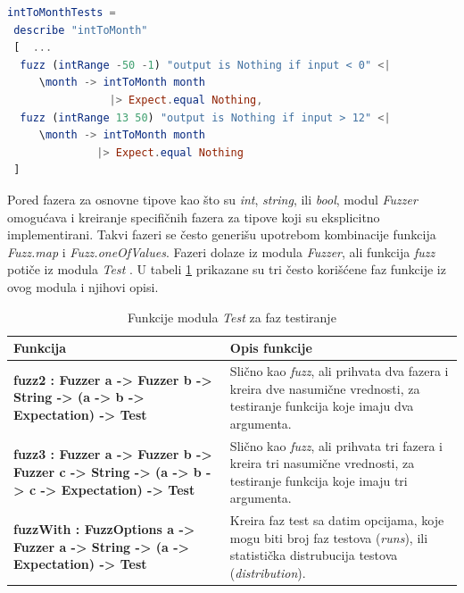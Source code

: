 \documentclass[12pt,oneside]{memoir}
\begin{document}
\begin{minipage}{\linewidth}
\begin{lstlisting}[language=elm, basicstyle=\small, caption={Implementacija faz testova za funkciju \emph{intToMonth}},captionpos=b, label={lst:faztest}]
intToMonthTests =
 describe "intToMonth" 
 [  ...
  fuzz (intRange -50 -1) "output is Nothing if input < 0" <|
     \month -> intToMonth month
     	        |> Expect.equal Nothing, 
  fuzz (intRange 13 50) "output is Nothing if input > 12" <|
     \month -> intToMonth month
              |> Expect.equal Nothing 
 ]
\end{lstlisting}
\end{minipage}

\vspace*{1\baselineskip}
\par Pored fazera za osnovne tipove kao što su \emph{int}, \emph{string}, ili \emph{bool}, modul \emph{Fuzzer} omogućava i kreiranje specifičnih fazera za tipove koji su eksplicitno implementirani. Takvi fazeri se često generišu upotrebom kombinacije funkcija \emph{Fuzz.map} i \emph{Fuzz.oneOfValues}. Fazeri dolaze iz modula \emph{Fuzzer}, ali funkcija \emph{fuzz} potiče iz modula \emph{Test} \cite{testmodul}. U tabeli \ref{tab:fuzzer} prikazane su tri često korišćene faz funkcije iz ovog modula i njihovi opisi. \newpage

\begin{table}[!htbp]
\centering
\caption{Funkcije modula \emph{Test} za faz testiranje}
\label{tab:fuzzer}
\begin{center}
\begin{tabular}{ | m{10cm} | m{10em} | } 
 \hline
\textbf{Funkcija} &  \textbf{Opis funkcije} \\ 
  \hline
 \small{\textbf{fuzz2 : Fuzzer a -> Fuzzer b -> String -> (a -> b -> Expectation) -> Test}} & \small{Slično kao \emph{fuzz}, ali prihvata dva fazera i kreira dve nasumične vrednosti, za testiranje funkcija koje imaju dva argumenta.} \\ 
  \hline
   \small{\textbf{fuzz3 :
    Fuzzer a
    -> Fuzzer b
    -> Fuzzer c
    -> String
    -> (a -> b -> c -> Expectation)
    -> Test}} & \small{Slično kao \emph{fuzz}, ali prihvata tri fazera i kreira tri nasumične vrednosti, za testiranje funkcija koje imaju tri argumenta.} \\ 
  \hline
 \small{\textbf{fuzzWith : FuzzOptions a -> Fuzzer a -> String -> (a -> Expectation) -> Test}} & \small{Kreira faz test sa datim opcijama, koje mogu biti broj faz testova (\textit{runs}), ili statistička distrubucija testova (\textit{distribution}).}  \\ 
\hline

\end{tabular}
\end{center}
\end{table}
\end{document}
